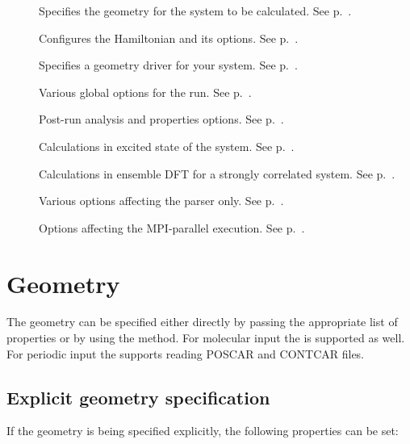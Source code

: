 \begin{description}
\item[] Specifies the geometry for the system to be
  calculated.  See p.~.
\item[] Configures the Hamiltonian and its options. See
  p.~.
\item[] Specifies a geometry driver for your system.  See
  p.~.
\item[]  Various global options for the run. See
  p.~.
\item[]  Post-run analysis and properties options. See
  p.~.
\item[] Calculations in excited state of the system.
  See p.~.
\item[] Calculations in ensemble DFT for a strongly correlated system.
  See p.~.
\item[] Various options affecting the parser only.
  See p.~.
\item[] Options affecting the MPI-parallel execution. See
  p.~.
\end{description}


\section{Geometry}
\label{sec:dftbp.Geometry}

The geometry can be specified either directly by passing the
appropriate list of properties or by using the 
method.
For molecular input the  is supported as well.
For periodic input the  supports reading POSCAR and CONTCAR files.

\subsection{Explicit geometry specification}

If the geometry is being specified explicitly, the following
properties can be set:

